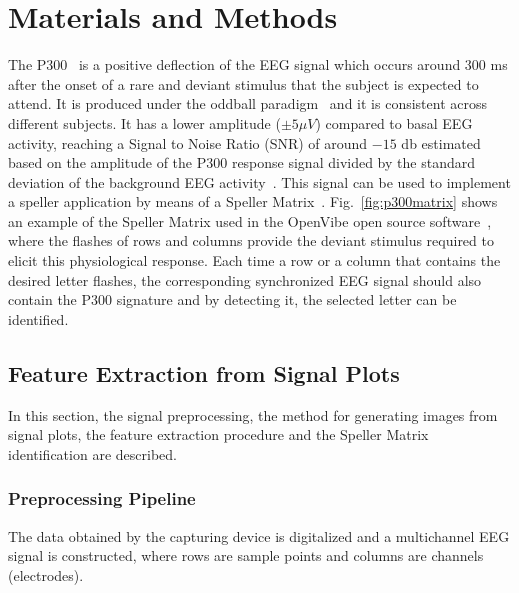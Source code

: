 \documentclass[utf8]{frontiersSCNS} %
\begin{document}
\section{Materials and Methods}

The P300~\citep{Farwell1988,Knuth2006} is a positive deflection of the EEG signal which occurs around $300$ ms after the onset of a rare and deviant stimulus that the subject is expected to attend.  It is produced under the oddball paradigm~\citep{WolpawJonathanR2012} and it is consistent across different subjects. It has a lower amplitude  ($\pm 5 \mu V $) compared to basal EEG activity, reaching a Signal to Noise Ratio (SNR) of around $-15$ db estimated based on the amplitude of the P300 response signal divided by the standard deviation of the background EEG activity~\citep{Hu2010}.  This signal can be used to implement a speller application by means of a Speller Matrix~\citep{Farwell1988}. Fig.~\ref{fig:p300matrix} shows an example of the Speller Matrix used in the OpenVibe open source software~\citep{Renard2010}, where the flashes of rows and columns provide the deviant stimulus required to elicit this physiological response.   Each time a row or a column that contains the desired letter flashes, the corresponding synchronized EEG signal should also contain the P300 signature and by detecting it, the selected letter can be identified.

\subsection{Feature Extraction from Signal Plots} \label{Feature}

In this section, the signal preprocessing, the method for generating images from signal plots, the feature extraction procedure and the Speller Matrix identification are described. 

\subsubsection{Preprocessing Pipeline} \label{Pipeline}

The data obtained by the capturing device is digitalized and a multichannel EEG signal is constructed, where rows are sample points and columns are channels (electrodes).
\end{document}
